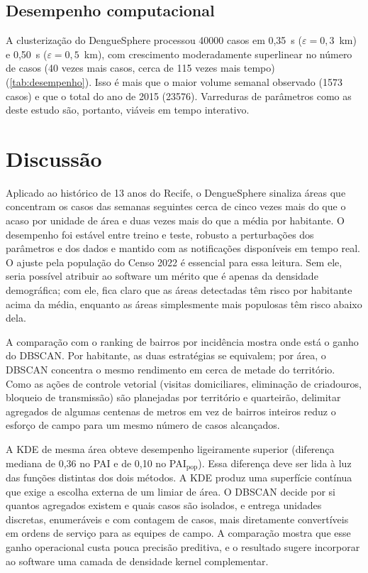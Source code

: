 \documentclass[11pt,a4paper]{article}
\begin{document}


\subsection{Desempenho computacional}

A clusterização do DengueSphere processou \num{40000} casos em 0,35~s ($\varepsilon = 0{,}3$~km) e 0,50~s
($\varepsilon = 0{,}5$~km), com crescimento moderadamente superlinear no número de casos (40 vezes mais casos, cerca de 115 vezes mais tempo) (\cref{tab:desempenho}). Isso é
mais que o maior volume semanal observado (\num{1573} casos) e que o total do ano de 2015 (\num{23576}). Varreduras de
parâmetros como as deste estudo são, portanto, viáveis em tempo interativo.



\section{Discussão}

Aplicado ao histórico de 13 anos do Recife, o DengueSphere sinaliza áreas que concentram os casos das semanas seguintes
cerca de cinco vezes mais do que o acaso por unidade de área e duas vezes mais do que a média por habitante. O
desempenho foi estável entre treino e teste, robusto a perturbações dos parâmetros e dos dados e mantido com as
notificações disponíveis em tempo real. O ajuste pela população do Censo 2022 é essencial para essa leitura. Sem ele,
seria possível atribuir ao software um mérito que é apenas da densidade demográfica; com ele, fica claro que as áreas
detectadas têm risco por habitante acima da média, enquanto as áreas simplesmente mais populosas têm risco abaixo dela.

A comparação com o ranking de bairros por incidência mostra onde está o ganho do DBSCAN. Por habitante, as duas
estratégias se equivalem; por área, o DBSCAN concentra o mesmo rendimento em cerca de metade do território. Como as
ações de controle vetorial (visitas domiciliares, eliminação de criadouros, bloqueio de transmissão) são planejadas por
território e quarteirão, delimitar agregados de algumas centenas de metros em vez de bairros inteiros reduz o esforço de
campo para um mesmo número de casos alcançados.

A KDE de mesma área obteve desempenho ligeiramente superior (diferença mediana de 0,36 no PAI e de 0,10 no
PAI$_\text{pop}$). Essa diferença deve ser lida à luz das funções distintas dos dois métodos. A KDE produz uma superfície
contínua que exige a escolha externa de um limiar de área. O DBSCAN decide por si quantos agregados existem e quais casos
são isolados, e entrega unidades discretas, enumeráveis e com contagem de casos, mais diretamente convertíveis em ordens
de serviço para as equipes de campo. A comparação mostra que esse ganho operacional custa pouca precisão preditiva, e o
resultado sugere incorporar ao software uma camada de densidade kernel complementar.
\end{document}

